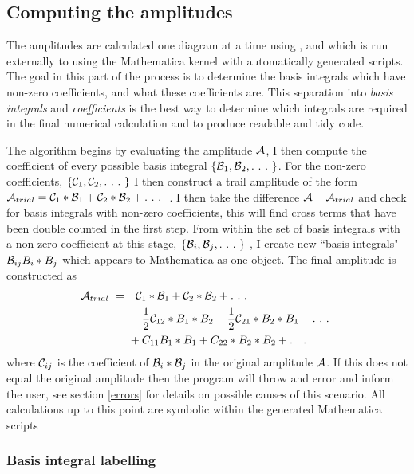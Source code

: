 \subsection{Computing the amplitudes}\label{sec:amplitudes}

The amplitudes are calculated one diagram at a time using \feynartss, \feyncalc and \tarcer which is run externally to \CC using the Mathematica kernel with automatically generated scripts.  The goal in this part of the process is to determine the basis integrals which have non-zero coefficients, and what these coefficients are.  This separation into \textit{basis integrals} and \textit{coefficients} is the best way to determine which integrals are required in the final numerical calculation and to produce readable and tidy code.

The algorithm begins by evaluating the amplitude $\mathcal{A}$, I then compute the coefficient of every possible basis integral $\{\B_1,\B_2,.\ .\ .\ \}$.  For the non-zero coefficients, $\{\mathcal{C}_1,\mathcal{C}_2, .\ .\ .\  \}$ I then construct a trail amplitude of the form $\mathcal{A}_{trial} = \mathcal{C}_1 * \mathcal{B}_1 + \mathcal{C}_2 * \mathcal{B}_2 + .\ .\ .\ $ .  I then take the difference $\mathcal{A} - \mathcal{A}_{trial}$ and check for basis integrals with non-zero coefficients, this will find cross terms that have been double counted in the first step.  From within the set of basis integrals with a non-zero coefficient at this stage, $\{\mathcal{B}_i,\mathcal{B}_j,.\ .\ .\ \}$ , I create new ``basis integrals" $\mathcal{B}_{ij}  B_i*B_j$ which appears to Mathematica as one object.  The final amplitude is constructed as
\begin{align*}
 \A_{trial}\ = \ & \ \ \C_1 * \B_1 + \C_2 * \B_2 + .\ .\ .\ \\ 
  &-\frac{1}{2} \C_{12} * B_1*B_2  -\frac{1}{2} \C_{21} * B_2*B_1 - .\ .\ .\ \\
  & + C_{11} B_1*B_1 + C_{22}*B_2*B_2 + .\ .\ .\ 
\end{align*}
where $ \mathcal{C}_{ij}$ is the coefficient of  $\mathcal{B}_i*\mathcal{B}_j$ in the original amplitude $\mathcal{A}$.  If this does not equal the original amplitude then the program will throw and error and inform the user, see section \ref{errors} for details on possible causes of this scenario.  All calculations up to this point are symbolic within the generated Mathematica scripts

\subsubsection{Basis integral labelling}

